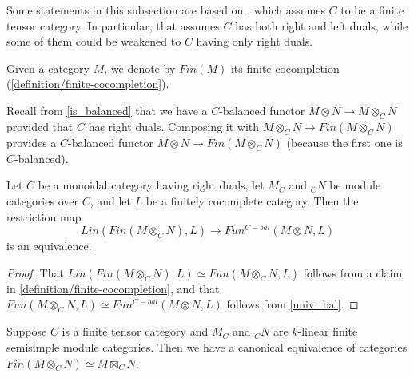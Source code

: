 \begin{remark}
  Some statements in this subsection are based
  on \cite{douglas/balanced-product}, which assumes $C$ to be a finite tensor
  category. In particular, that assumes $C$ has both right and left duals, while
  some of them could be weakened to $C$ having only right
  duals.
\end{remark}

\begin{notation}
  Given a category $M$, we denote by $Fin(M)$ its finite cocompletion
  (\ref{definition/finite-cocompletion}).
\end{notation}

\noindent Recall from \ref{is_balanced} that we have a $C$-balanced functor $M
\otimes N \to M\otimes_C N$ provided that $C$ has right duals. Composing it
with $M\otimes_C N \to Fin(M\otimes_C N)$ provides a $C$-balanced functor
$M\otimes N\to Fin(M\otimes_C N)$ (because the first one is $C$-balanced).

\begin{lemma}\label{univ_finbal}

  \noindent Let $C$ be a monoidal category having right duals, let $M_C$ and $_{C}N$ be
  module categories over $C$, and let $L$ be a finitely cocomplete category.
  Then the restriction map $$Lin(Fin(M\otimes_C N),L)\to Fun^{C-bal}(M\otimes
  N,L)$$ is an equivalence.
\end{lemma}

\begin{proof}
  That $Lin(Fin(M\otimes_C N),L) \simeq Fun(M \otimes_{C} N, L)$ follows from
  a claim in \ref{definition/finite-cocompletion}, and that $Fun(M \otimes_{C}
  N, L) \simeq Fun^{C-bal}(M \otimes N, L)$ follows from \ref{univ_bal}.
\end{proof}

\begin{proposition}\label{fin_eq_bal}

  Suppose $C$ is a finite tensor category and $M_C$ and $_{C}N$ are $k$-linear
  finite semisimple module categories. Then we have a canonical equivalence of
  categories $Fin(M\otimes_C N) \simeq M\boxtimes_C N$.
    
\end{proposition}

